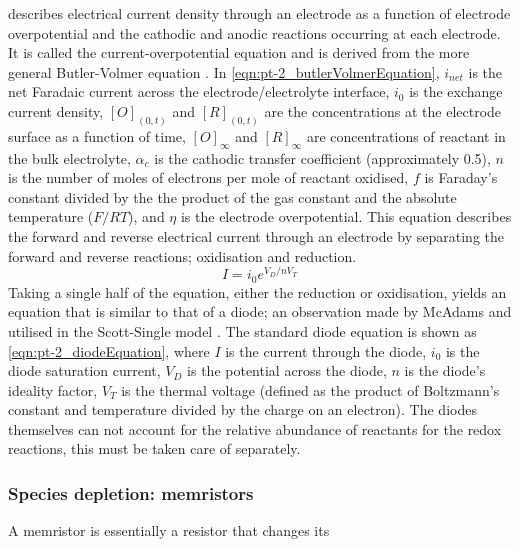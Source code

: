        describes electrical current density through an electrode as a function of electrode overpotential and the cathodic and anodic reactions occurring at each electrode.
      It is called the current-overpotential equation and is derived from the more general Butler-Volmer equation \cite{Merrill2005,ScottSingle2013}.
      In \cref{eqn:pt-2_butlerVolmerEquation}, $i_{net}$ is the net Faradaic current across the electrode/electrolyte interface,
      $i_{0}$ is the exchange current density,
      $[O]_{(0,t)}$ and $[R]_{(0,t)}$ are the concentrations at the electrode surface as a function of time,
      $[O]_{\infty}$ and $[R]_{\infty}$ are concentrations of reactant in the bulk electrolyte,
      $\alpha_{c}$ is the cathodic transfer coefficient (approximately 0.5),
      $n$ is the number of moles of electrons per mole of reactant oxidised,
      $f$ is Faraday's constant divided by the the product of the gas constant and the absolute temperature ($F/RT$),
      and $\eta$ is the electrode overpotential.
      This equation describes the forward and reverse electrical current through an electrode by separating the forward and reverse reactions; oxidisation and reduction.
      \begin{equation}
        I = i_0 e^{V_D / n V_T}
        \label{eqn:pt-2_diodeEquation}
      \end{equation}
      Taking a single half of the equation, either the reduction or oxidisation, yields an equation that is similar to that of a diode; an observation made by McAdams and utilised in the Scott-Single model \cite{McAdams1995}.
      The standard diode equation is shown as \cref{eqn:pt-2_diodeEquation}, where
      $I$ is the current through the diode,
      $i_0$ is the diode saturation current,
      $V_D$ is the potential across the diode,
      $n$ is the diode's ideality factor,
      $V_T$ is the thermal voltage (defined as the product of Boltzmann's constant and temperature divided by the charge on an electron).
      The diodes themselves can not account for the relative abundance of reactants for the redox reactions, this must be taken care of separately.

    \subsubsection{Species depletion: memristors}
      A memristor is essentially a resistor that changes its

